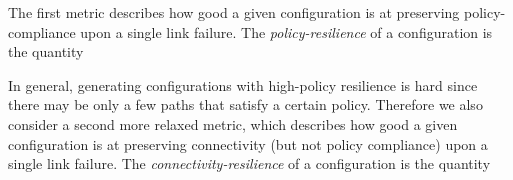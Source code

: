 The first metric describes how good a given configuration
is at preserving policy-compliance upon a single link failure. 
The \emph{policy-resilience} of a configuration
is the quantity 

In general, generating configurations with high-policy resilience is hard
since there may be only a few paths that satisfy a certain policy.
Therefore we also consider a second more relaxed metric, which describes how good a given configuration
is at preserving connectivity (but not policy compliance) upon a single link failure. 
The \emph{connectivity-resilience} of a configuration
is the quantity 


